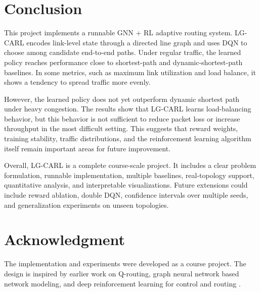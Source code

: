 \documentclass[9pt,a4paper,twocolumn,twoside]{rho-class/rho}
\begin{document}
\section{Conclusion}

This project implements a runnable GNN + RL adaptive routing system. LG-CARL encodes link-level state through a directed line graph and uses DQN to choose among candidate end-to-end paths. Under regular traffic, the learned policy reaches performance close to shortest-path and dynamic-shortest-path baselines. In some metrics, such as maximum link utilization and load balance, it shows a tendency to spread traffic more evenly.

However, the learned policy does not yet outperform dynamic shortest path under heavy congestion. The results show that LG-CARL learns load-balancing behavior, but this behavior is not sufficient to reduce packet loss or increase throughput in the most difficult setting. This suggests that reward weights, training stability, traffic distributions, and the reinforcement learning algorithm itself remain important areas for future improvement.

Overall, LG-CARL is a complete course-scale project. It includes a clear problem formulation, runnable implementation, multiple baselines, real-topology support, quantitative analysis, and interpretable visualizations. Future extensions could include reward ablation, double DQN, confidence intervals over multiple seeds, and generalization experiments on unseen topologies.

\section*{Acknowledgment}

The implementation and experiments were developed as a course project. The design is inspired by earlier work on Q-routing, graph neural network based network modeling, and deep reinforcement learning for control and routing \cite{boyan1993packet,rusek2020routenet,almasan2019deep,mnih2015human,hamilton2017inductive}.

\printbibliography
\end{document}
